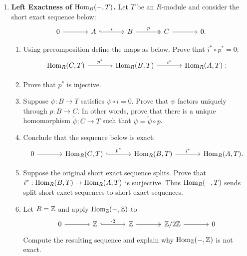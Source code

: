 \documentclass[12pt,reqno]{amsart}
\begin{document}
\begin{enumerate}[leftmargin=*, resume=problems]
\item \textbf{Left Exactness of $\operatorname{Hom}_R(-,T)$.} Let $T$ be an $R$-module and consider the short exact sequence below:
\[
\begin{tikzcd}[column sep=large]
0 \arrow[r] & A \arrow[r, hook, "i"] & B \arrow[r, two heads, "p"] & C \arrow[r] & 0.
\end{tikzcd}
\]
\begin{enumerate}
\item Using precomposition define the maps as below. Prove that $i^*\circ p^*=0$:
\[
\begin{tikzcd}[column sep=large]
\Hom_R(C,T) \arrow[r, "p^*"] & \Hom_R(B,T) \arrow[r, "i^*"] & \Hom_R(A,T):
\end{tikzcd}
\]
\item Prove that $p^*$ is injective.
\item Suppose $\psi:B\to T$ satisfies $\psi\circ i=0$. Prove that $\psi$ factors uniquely through $p:B\to C$. In other words, prove that there is a unique homomorphism $\widetilde{\psi}:C\to T$ such that $\psi=\widetilde{\psi}\circ p$.
\item Conclude that the sequence below is exact:
\[
\begin{tikzcd}[column sep=large]
0 \arrow[r] & \Hom_R(C,T) \arrow[r, hook, "p^*"] & \Hom_R(B,T) \arrow[r, "i^*"] & \Hom_R(A,T).
\end{tikzcd}
\]
\item Suppose the original short exact sequence splits. Prove that $i^*:\operatorname{Hom}_R(B,T)\to \operatorname{Hom}_R(A,T)$ is surjective. Thus $\operatorname{Hom}_R(-,T)$ sends split short exact sequences to short exact sequences.
\item Let $R=\mathbb{Z}$ and apply $\operatorname{Hom}_{\mathbb{Z}}(-,\mathbb{Z})$ to
\[
\begin{tikzcd}[column sep=large]
0 \arrow[r] & \ZZ \arrow[r, hook, "\cdot 2"] & \ZZ \arrow[r, two heads] & \ZZ/2\ZZ \arrow[r] & 0
\end{tikzcd}
\]
Compute the resulting sequence and explain why $\operatorname{Hom}_{\mathbb{Z}}(-,\mathbb{Z})$ is not exact.
\end{enumerate}


\end{enumerate}
\end{document}
